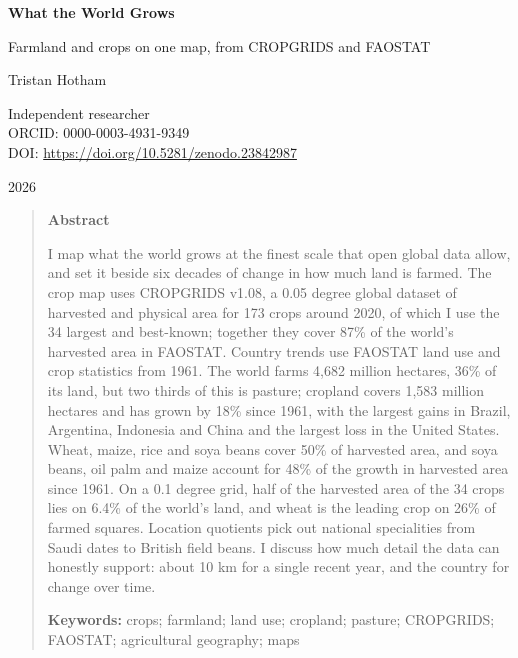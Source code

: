 \documentclass[11pt,a4paper]{article}
\begin{document}
\begin{center}
{\Large\bfseries What the World Grows\par}
\vspace{0.4em}
{\large Farmland and crops on one map, from CROPGRIDS and FAOSTAT\par}
\vspace{1.2em}
{\large Tristan Hotham\par}
\vspace{0.3em}
{\small Independent researcher\\
ORCID: 0000-0003-4931-9349\\
DOI: \href{https://doi.org/10.5281/zenodo.23842987}{https://doi.org/10.5281/zenodo.23842987}\par}
\vspace{0.8em}
2026
\end{center}

\begin{quote}
\small
\begin{center}\textbf{Abstract}\end{center}
I map what the world grows at the finest scale that open global data allow, and set it beside six decades of change in how much land is farmed. The crop map uses CROPGRIDS v1.08, a 0.05 degree global dataset of harvested and physical area for 173 crops around 2020, of which I use the 34 largest and best-known; together they cover 87\% of the world's harvested area in FAOSTAT. Country trends use FAOSTAT land use and crop statistics from 1961. The world farms 4,682 million hectares, 36\% of its land, but two thirds of this is pasture; cropland covers 1,583 million hectares and has grown by 18\% since 1961, with the largest gains in Brazil, Argentina, Indonesia and China and the largest loss in the United States. Wheat, maize, rice and soya beans cover 50\% of harvested area, and soya beans, oil palm and maize account for 48\% of the growth in harvested area since 1961. On a 0.1 degree grid, half of the harvested area of the 34 crops lies on 6.4\% of the world's land, and wheat is the leading crop on 26\% of farmed squares. Location quotients pick out national specialities from Saudi dates to British field beans. I discuss how much detail the data can honestly support: about 10 km for a single recent year, and the country for change over time.

\textbf{Keywords:} crops; farmland; land use; cropland; pasture; CROPGRIDS; FAOSTAT; agricultural geography; maps
\end{quote}
\end{document}
